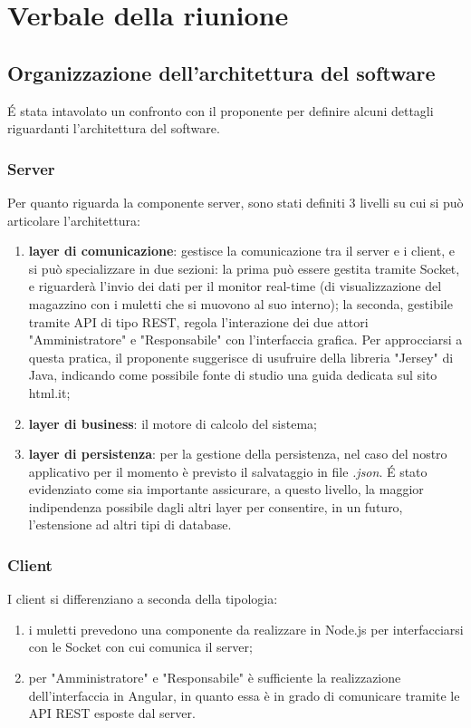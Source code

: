 \section{Verbale della riunione}

\subsection {Organizzazione dell'architettura del software}

\'E stata intavolato un confronto con il proponente per definire alcuni dettagli riguardanti l'architettura del software.

\subsubsection{Server}

Per quanto riguarda la componente server, sono stati definiti 3 livelli su cui si può articolare l'architettura:
\begin{enumerate}
	\item \textbf{layer di comunicazione}: gestisce la comunicazione tra il server e i client, e si può specializzare in due sezioni: la prima può essere gestita tramite Socket, e riguarderà l'invio dei dati per il monitor real-time (di visualizzazione del magazzino con i muletti che si muovono al suo interno); la seconda, gestibile tramite API di tipo REST, regola l'interazione dei due attori "Amministratore" e "Responsabile" con l'interfaccia grafica. Per approcciarsi a questa pratica, il proponente suggerisce di usufruire della libreria "Jersey" di Java, indicando come possibile fonte di studio una guida dedicata sul sito html.it;
	\item \textbf{layer di business}: il motore di calcolo del sistema;
	\item \textbf{layer di persistenza}: per la gestione della persistenza, nel caso del nostro applicativo per il momento è previsto il salvataggio in file \textit{.json}. \'E stato evidenziato come sia importante assicurare, a questo livello, la maggior indipendenza possibile dagli altri layer per consentire, in un futuro, l'estensione ad altri tipi di database.
\end{enumerate}

\subsubsection{Client}

I client si differenziano a seconda della tipologia:
\begin{enumerate}
	\item i muletti prevedono una componente da realizzare in Node.js per interfacciarsi con le Socket con cui comunica il server;
	\item per "Amministratore" e "Responsabile" è sufficiente la realizzazione dell'interfaccia in Angular, in quanto essa è in grado di comunicare tramite le API REST esposte dal server.
\end{enumerate}

